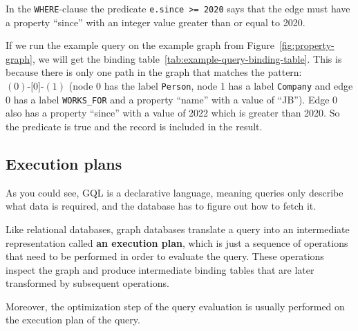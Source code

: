 \documentclass[14pt]{constructor-thesis}
\theoremstyle{definition}
\newcommand{\pathstart}[1]{(#1)}
\newcommand{\pathhop}[3]{#1 \texttt{-[} #2 \texttt{]-} (#3)}
\begin{document}
In the \texttt{WHERE}-clause the predicate \verb+e.since >= 2020+ says that the edge must have a property ``since'' with an integer value greater than or equal to 2020.


If we run the example query on the example graph from Figure~\ref{fig:property-graph}, we will get the binding table~\ref{tab:example-query-binding-table}. This is because there is only one path in the graph that matches the pattern: $\pathhop{\pathstart{0}}{0}{1}$ (node 0 has the label \texttt{Person}, node 1 has a label \texttt{Company} and edge 0 has a label \texttt{WORKS\_FOR} and a property ``name'' with a value of ``JB''). Edge 0 also has a property ``since'' with a value of 2022 which is greater than 2020. So the predicate is true and the record is included in the result.

\subsection{Execution plans}

As you could see, GQL is a declarative language, meaning queries only describe what data is required, and the database has to figure out how to fetch it.

Like relational databases, graph databases translate a query into an intermediate representation called \textbf{an execution plan}, which is just a sequence of operations that need to be performed in order to evaluate the query. These operations inspect the graph and produce intermediate binding tables that are later transformed by subsequent operations.

Moreover, the optimization step of the query evaluation is usually performed on the execution plan of the query.
\end{document}
